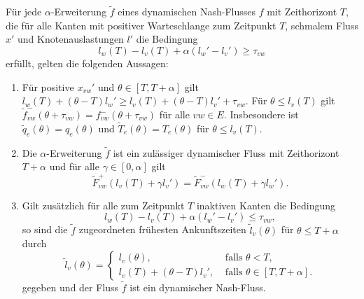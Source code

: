 \begin{theorem}\label{thm-alpha-extension-is-nash-flow}
	Für jede $\alpha$-Erweiterung $\tilde{f}$ eines dynamischen Nash-Flusses $f$ mit Zeithorizont $T$, die für alle Kanten mit positiver Warteschlange zum Zeitpunkt $T$, schmalem Fluss $x'$ und Knotenauslastungen $l'$ die Bedingung
	\begin{equation}\tag{$\alpha 1$}\label{equation-alpha-queuing-edge}
		l_w(T) - l_v(T) + \alpha(l_w' - l_v') \geq \tau_{vw}
	\end{equation}
	erfüllt, gelten die folgenden Aussagen:
	\begin{enumerate}[label=(\roman*)]
		\item Für positive $x_{vw}'$ und $\theta\in[T, T+\alpha]$ gilt $l_w(T) + (\theta - T)l_w' \geq l_v(T) + (\theta - T)l_v' + \tau_{vw}$.
		Für $\theta \leq l_v(T)$ gilt $\tilde{f}^-_{vw}(\theta + \tau_{vw})=f^-_{vw}(\theta + \tau_{vw})$ für alle $vw\in E$.
		Insbesondere ist $\tilde{q}_e(\theta) = q_e(\theta)$ und $\tilde{T}_e(\theta) = T_e(\theta)$ für $\theta \leq l_v(T)$.
		\item Die $\alpha$-Erweiterung $\tilde{f}$ ist ein zulässiger dynamischer Fluss mit Zeithorizont $T+\alpha$ und für alle $\gamma \in [0, \alpha]$ gilt
		\[ \tilde{F}_{vw}^+(l_v(T) + \gamma l_v') = \tilde{F}_{vw}^-(l_w(T) + \gamma l_w'). \]
		\item Gilt zusätzlich für alle zum Zeitpunkt $T$ inaktiven Kanten die Bedingung \begin{equation}\tag{$\alpha 2$}\label{equation-alpha-inactive-edge}
		l_w(T) - l_v(T) + \alpha(l_w' -l_v') \leq \tau_{vw},
		\end{equation}
		so sind die $\tilde{f}$ zugeordneten frühesten Ankunftszeiten $\tilde{l}_v(\theta)$ für $\theta \leq T+\alpha$ durch
		\[ \tilde{l}_v(\theta) = \begin{cases}
		l_v(\theta), & \text{ falls $\theta < T$,} \\
		l_v(T) + (\theta - T) l_v', & \text{ falls $\theta \in [T, T+\alpha]$.}
		\end{cases}\]
		gegeben und der Fluss $\tilde{f}$ ist ein dynamischer Nash-Fluss.
	\end{enumerate}
\end{theorem}
